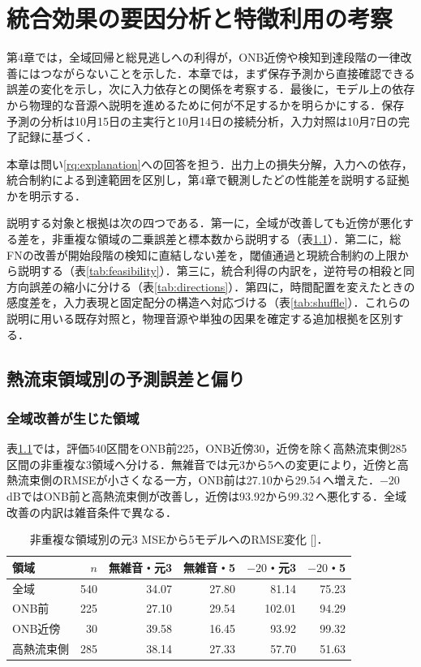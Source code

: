 \chapter{統合効果の要因分析と特徴利用の考察}\label{ch:discussion}
第4章では，全域回帰と総見逃しへの利得が，ONB近傍や検知到達段階の一律改善にはつながらないことを示した．本章では，まず保存予測から直接確認できる誤差の変化を示し，次に入力依存との関係を考察する．最後に，モデル上の依存から物理的な音源へ説明を進めるために何が不足するかを明らかにする．保存予測の分析は10月15日の主実行と10月14日の接続分析\cite{localLink}，入力対照は10月7日の完了記録\cite{localInput}に基づく．

本章は問い\ref{rq:explanation}への回答を担う．出力上の損失分解，入力への依存，統合制約による到達範囲を区別し，第4章で観測したどの性能差を説明する証拠かを明示する．

説明する対象と根拠は次の四つである．第一に，全域が改善しても近傍が悪化する差を，非重複な領域の二乗誤差と標本数から説明する（表\ref{tab:regions}）．第二に，総FNの改善が開始段階の検知に直結しない差を，閾値通過と現統合制約の上限から説明する（表\ref{tab:feasibility}）．第三に，統合利得の内訳を，逆符号の相殺と同方向誤差の縮小に分ける（表\ref{tab:directions}）．第四に，時間配置を変えたときの感度差を，入力表現と固定配分の構造へ対応づける（表\ref{tab:shuffle}）．これらの説明に用いる既存対照と，物理音源や単独の因果を確定する追加根拠を区別する．

\section{熱流束領域別の予測誤差と偏り}
\subsection{全域改善が生じた領域}
表\ref{tab:regions}では，評価540区間をONB前225，ONB近傍30，近傍を除く高熱流束側285区間の非重複な3領域へ分ける．無雑音では元3から5への変更により，近傍と高熱流束側のRMSEが小さくなる一方，ONB前は27.10から29.54\,\kw{}へ増えた．$-20$\,dBではONB前と高熱流束側が改善し，近傍は93.92から99.32\,\kw{}へ悪化する．全域改善の内訳は雑音条件で異なる．

\begin{table}[htbp]
\centering\small
\caption{非重複な領域別の元3 MSEから5モデルへのRMSE変化 [\kw{}]．}
\label{tab:regions}
\begin{tabular}{lrrrrr}
\toprule
領域 & $n$ & 無雑音・元3 & 無雑音・5 & $-20$・元3 & $-20$・5 \\
\midrule
全域 & 540 & 34.07 & 27.80 & 81.14 & 75.23 \\
ONB前 & 225 & 27.10 & 29.54 & 102.01 & 94.29 \\
ONB近傍 & 30 & 39.58 & 16.45 & 93.92 & 99.32 \\
高熱流束側 & 285 & 38.14 & 27.33 & 57.70 & 51.63 \\
\bottomrule
\end{tabular}
\end{table}

